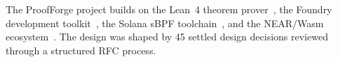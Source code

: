 \documentclass[sigconf]{acmart}
\begin{document}
\begin{acks}
The ProofForge project builds on the Lean~4 theorem prover~\cite{lean4}, the Foundry
development toolkit~\cite{foundry}, the Solana sBPF toolchain~\cite{solana}, and the
NEAR/Wasm ecosystem~\cite{near}. The design was shaped by 45 settled design decisions reviewed
through a structured RFC process.
\end{acks}



\end{document}
